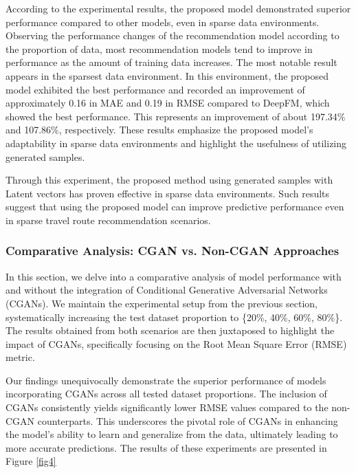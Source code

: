 \documentclass[]{article}
\begin{document}
According to the experimental results, the proposed model demonstrated superior performance compared to other models, even in sparse data environments. Observing the performance changes of the recommendation model according to the proportion of data, most recommendation models tend to improve in performance as the amount of training data increases. The most notable result appears in the sparsest data environment. In this environment, the proposed model exhibited the best performance and recorded an improvement of approximately 0.16 in MAE and 0.19 in RMSE compared to DeepFM, which showed the best performance. This represents an improvement of about 197.34\% and 107.86\%, respectively. These results emphasize the proposed model's adaptability in sparse data environments and highlight the usefulness of utilizing generated samples.

Through this experiment, the proposed method using generated samples with Latent vectors has proven effective in sparse data environments. Such results suggest that using the proposed model can improve predictive performance even in sparse travel route recommendation scenarios.


\subsubsection{Comparative Analysis: CGAN vs. Non-CGAN Approaches}

In this section, we delve into a comparative analysis of model performance with and without the integration of Conditional Generative Adversarial Networks (CGANs). We maintain the experimental setup from the previous section, systematically increasing the test dataset proportion to \{20\%, 40\%, 60\%, 80\%\}. The results obtained from both scenarios are then juxtaposed to highlight the impact of CGANs, specifically focusing on the Root Mean Square Error (RMSE) metric.

Our findings unequivocally demonstrate the superior performance of models incorporating CGANs across all tested dataset proportions. The inclusion of CGANs consistently yields significantly lower RMSE values compared to the non-CGAN counterparts. This underscores the pivotal role of CGANs in enhancing the model's ability to learn and generalize from the data, ultimately leading to more accurate predictions. The results of these experiments are presented in Figure \ref{fig4}
\end{document}
